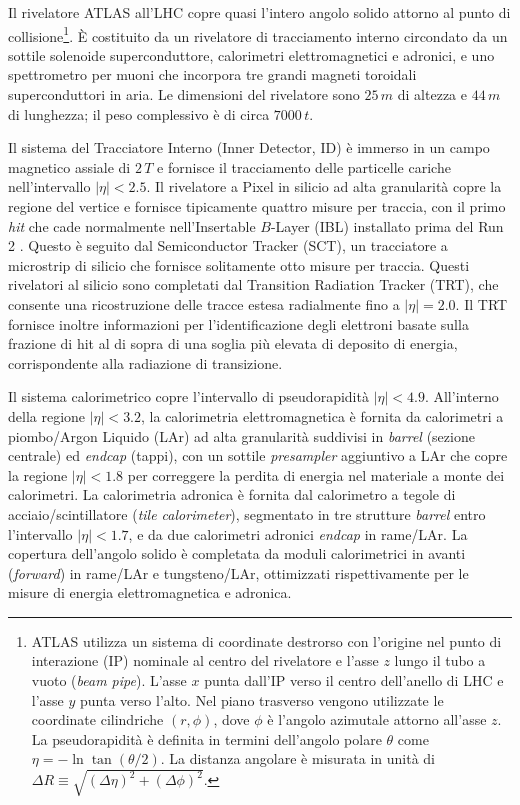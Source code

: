 \documentclass[11pt]{article}
\begin{document}
Il rivelatore ATLAS all'LHC copre quasi l'intero angolo solido attorno al punto di collisione\footnote{ATLAS utilizza un sistema di coordinate destrorso con l'origine nel punto di interazione (IP) nominale al centro del rivelatore e l'asse $z$ lungo il tubo a vuoto (\textit{beam pipe}). L'asse $x$ punta dall'IP verso il centro dell'anello di LHC e l'asse $y$ punta verso l'alto. Nel piano trasverso vengono utilizzate le coordinate cilindriche $(r, \phi)$, dove $\phi$ è l'angolo azimutale attorno all'asse $z$. La pseudorapidità è definita in termini dell'angolo polare $\theta$ come $\eta = -\ln\tan(\theta/2)$. La distanza angolare è misurata in unità di $\Delta R \equiv \sqrt{(\Delta\eta)^2 + (\Delta\phi)^2}$.}. 
È costituito da un rivelatore di tracciamento interno circondato da un sottile solenoide superconduttore, calorimetri elettromagnetici e adronici, e uno spettrometro per muoni che incorpora tre grandi magneti toroidali superconduttori in aria. Le dimensioni del rivelatore sono $25\,\unit{m}$ di altezza e $44\,\unit{m}$ di lunghezza; il peso complessivo è di circa $7000\,\unit{t}$.

Il sistema del Tracciatore Interno (Inner Detector, ID) è immerso in un campo magnetico assiale di $2\,\unit{T}$ e fornisce il tracciamento delle particelle cariche nell'intervallo $|\eta| < 2.5$. Il rivelatore a Pixel in silicio ad alta granularità copre la regione del vertice e fornisce tipicamente quattro misure per traccia, con il primo \textit{hit} che cade normalmente nell'Insertable $B$-Layer (IBL) installato prima del Run 2 . Questo è seguito dal Semiconductor Tracker (SCT), un tracciatore a microstrip di silicio che fornisce solitamente otto misure per traccia. Questi rivelatori al silicio sono completati dal Transition Radiation Tracker (TRT), che consente una ricostruzione delle tracce estesa radialmente fino a $|\eta| = 2.0$. Il TRT fornisce inoltre informazioni per l'identificazione degli elettroni basate sulla frazione di hit al di sopra di una soglia più elevata di deposito di energia, corrispondente alla radiazione di transizione.

Il sistema calorimetrico copre l'intervallo di pseudorapidità $|\eta| < 4.9$. All'interno della regione $|\eta| < 3.2$, la calorimetria elettromagnetica è fornita da calorimetri a piombo/Argon Liquido (LAr) ad alta granularità suddivisi in \textit{barrel} (sezione centrale) ed \textit{endcap} (tappi), con un sottile \textit{presampler} aggiuntivo a LAr che copre la regione $|\eta| < 1.8$ per correggere la perdita di energia nel materiale a monte dei calorimetri. La calorimetria adronica è fornita dal calorimetro a tegole di acciaio/scintillatore (\textit{tile calorimeter}), segmentato in tre strutture \textit{barrel} entro l'intervallo $|\eta| < 1.7$, e da due calorimetri adronici \textit{endcap} in rame/LAr. La copertura dell'angolo solido è completata da moduli calorimetrici in avanti (\textit{forward}) in rame/LAr e tungsteno/LAr, ottimizzati rispettivamente per le misure di energia elettromagnetica e adronica.
\end{document}
